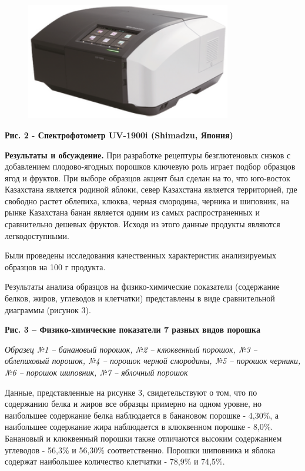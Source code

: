 {\begin{figure}[H]
	\centering
	\includegraphics[width=0.8\textwidth]{media/pish2/image19}
	\caption*{}
\end{figure}


{\bfseries Рис. 2 - Спектрофотометр UV-1900i (Shimadzu, Япония)}

{\bfseries Результаты и обсуждение.} При разработке рецептуры безглютеновых
снэков с добавлением плодово-ягодных порошков ключевую роль играет
подбор образцов ягод и фруктов. При выборе образцов акцент был сделан на
то, что юго-восток Казахстана является родиной яблоки, север Казахстана
является территорией, где свободно растет облепиха, клюква, черная
смородина, черника и шиповник, на рынке Казахстана банан является одним
из самых распространенных и сравнительно дешевых фруктов. Исходя из
этого данные продукты являются легкодоступными.

Были проведены исследования качественных характеристик анализируемых
образцов на 100 г продукта.

Результаты анализа образцов на физико-химические показатели (содержание
белков, жиров, углеводов и клетчатки) представлены в виде сравнительной
диаграммы (рисунок 3).

{\bfseries Рис. 3 -- Физико-химические показатели 7 разных видов порошка}

\emph{Образец №1 -- банановый порошок, №2 -- клюквенный порошок, №3 --
облепиховый порошок, №4 -- порошок черной смородины, №5 -- порошок
черники, №6 -- порошок шиповник, №7 -- яблочный порошок}

Данные, представленные на рисунке 3, свидетельствуют о том, что по
содержанию белка и жиров все образцы примерно на одном уровне, но
наибольшее содержание белка наблюдается в банановом порошке - 4,30\%, а
наибольшее содержание жира наблюдается в клюквенном порошке - 8,0\%.
Банановый и клюквенный порошки также отличаются высоким содержанием
углеводов - 56,3\% и 56,30\% соответственно. Порошки шиповника и яблока
содержат наибольшее количество клетчатки - 78,9\% и 74,5\%.

}
